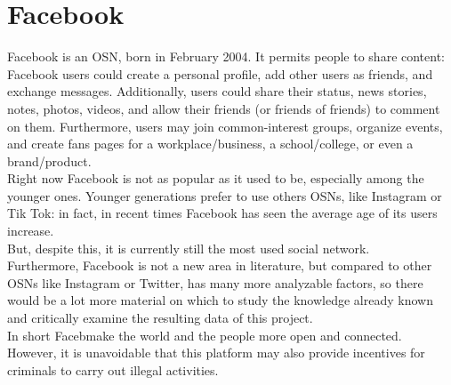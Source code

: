 \section{Facebook}
Facebook is an OSN, born in February 2004. 
It permits people to share content: Facebook users could create a personal profile, add other users as friends, and exchange messages. Additionally, users could share their status, news stories, notes, photos, videos, and allow their friends (or friends of friends) to comment on them. Furthermore, users may join common-interest groups, organize events, and create fans pages for a workplace/business, a school/college, or even a brand/product. \\
Right now Facebook is not as popular as it used to be, especially among the younger ones. Younger generations prefer to use others OSNs, like Instagram or Tik Tok: in fact, in recent times Facebook has seen the average age of its users increase.\\
But, despite this, it is currently still the most used social network.\\
Furthermore, Facebook is not a new area in literature, but compared to other OSNs like Instagram or Twitter, has many more analyzable factors, so there would be a lot more material on which to study the knowledge already known and critically examine the resulting data of this project.\\
In short Facebmake the world and the people more open and connected.\\
However, it is unavoidable that this platform may also provide incentives for criminals to carry out illegal activities.

